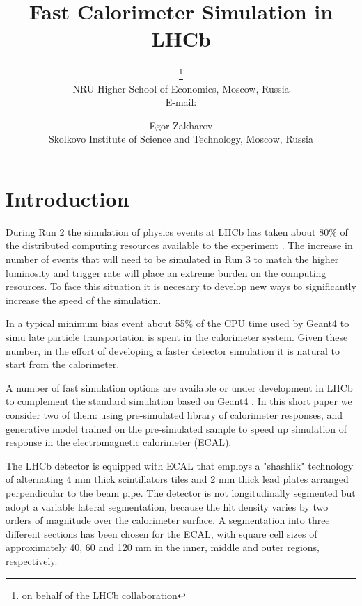 \documentclass{PoS}
\title{Fast Calorimeter Simulation in LHCb}
\author{\speaker{Fedor Ratnikov}\thanks{on
    behalf of the LHCb collaboration}\\
        NRU Higher School of Economics, Moscow, Russia\\
        E-mail: \email{Fedor.Ratnikov@cern.ch}}
\author{Egor Zakharov\\
        Skolkovo Institute of Science and Technology, Moscow, Russia
}
\begin{document}
\section{Introduction}
During Run 2 the simulation of physics events at LHCb has taken about
80\% of the distributed computing resources available to the
experiment \cite{LHCbCompUpgTDR}. The increase in number of events that will need to be simulated
in Run 3 to match the higher luminosity and trigger rate will place an
extreme burden on the computing resources. To face this situation
it is necesary to develop new ways to significantly increase the speed
of the simulation.

In a typical minimum bias event about 55\% of the CPU time used by
Geant4 to simu late particle transportation is spent in the
calorimeter system. 
Given these number, in the effort of developing a faster detector simulation it is natural to start from the calorimeter.

A number of fast simulation options are available or under development
in LHCb to complement the standard simulation based on Geant4 \cite{geant4}. 
In this short paper we consider two of them: using pre-simulated
library of calorimeter responses, and generative model trained on
the pre-simulated sample to speed up simulation of response in the
electromagnetic calorimeter (ECAL).

The LHCb detector \cite{LHCb} is equipped with  ECAL that employs a "shashlik" technology of alternating 4 mm thick
scintillators tiles and 2 mm thick lead plates arranged perpendicular
to the beam pipe. The detector is not longitudinally segmented but
adopt a variable lateral segmentation,  because the hit density varies
by two orders of magnitude over the calorimeter surface. 
A segmentation into three different sections has been chosen for the ECAL, with square cell sizes of approximately 40, 60 and 120 mm in the inner, middle and outer regions, respectively.

\end{document}

